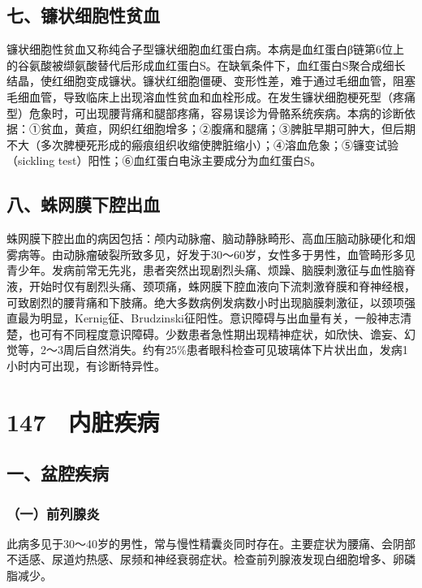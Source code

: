 \subsection{七、镰状细胞性贫血}

镰状细胞性贫血又称纯合子型镰状细胞血红蛋白病。本病是血红蛋白β链第6位上的谷氨酸被缬氨酸替代后形成血红蛋白S。在缺氧条件下，血红蛋白S聚合成细长结晶，使红细胞变成镰状。镰状红细胞僵硬、变形性差，难于通过毛细血管，阻塞毛细血管，导致临床上出现溶血性贫血和血栓形成。在发生镰状细胞梗死型（疼痛型）危象时，可出现腰背痛和腿部疼痛，容易误诊为骨骼系统疾病。本病的诊断依据：①贫血，黄疸，网织红细胞增多；②腹痛和腿痛；③脾脏早期可肿大，但后期不大（多次脾梗死形成的瘢痕组织收缩使脾脏缩小）；④溶血危象；⑤镰变试验（sickling
test）阳性；⑥血红蛋白电泳主要成分为血红蛋白S。

\subsection{八、蛛网膜下腔出血}

蛛网膜下腔出血的病因包括：颅内动脉瘤、脑动静脉畸形、高血压脑动脉硬化和烟雾病等。由动脉瘤破裂所致多见，好发于30～60岁，女性多于男性，血管畸形多见青少年。发病前常无先兆，患者突然出现剧烈头痛、烦躁、脑膜刺激征与血性脑脊液，开始时仅有剧烈头痛、颈项痛，蛛网膜下腔血液向下流刺激脊膜和脊神经根，可致剧烈的腰背痛和下肢痛。绝大多数病例发病数小时出现脑膜刺激征，以颈项强直最为明显，Kernig征、Brudzinski征阳性。意识障碍与出血量有关，一般神志清楚，也可有不同程度意识障碍。少数患者急性期出现精神症状，如欣快、谵妄、幻觉等，2～3周后自然消失。约有25\%患者眼科检查可见玻璃体下片状出血，发病1小时内可出现，有诊断特异性。

\protect\hypertarget{text00335.html}{}{}

\section{147　内脏疾病}

\subsection{一、盆腔疾病}

\subsubsection{（一）前列腺炎}

此病多见于30～40岁的男性，常与慢性精囊炎同时存在。主要症状为腰痛、会阴部不适感、尿道灼热感、尿频和神经衰弱症状。检查前列腺液发现白细胞增多、卵磷脂减少。


